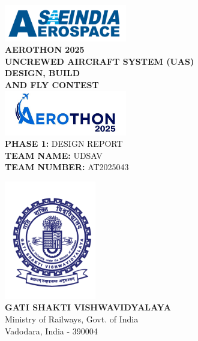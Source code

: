 \documentclass[12pt]{report}
\begin{document}
  \begin{center}
    \includegraphics[width=0.4\textwidth]{sae_aerospace.png}\\
    \vspace{1cm}
    \textbf{\LARGE AEROTHON 2025} \\
    \vspace{0.5in}
    \textbf{\Large UNCREWED AIRCRAFT SYSTEM  (UAS) \\
    DESIGN, BUILD \\ AND FLY CONTEST}\\
    \vspace{0.5cm}
    \includegraphics[width=0.4\textwidth]{aerothon2025.png}\\
    \vspace{0.5cm}
    \Large \textbf{PHASE 1:} DESIGN REPORT \\
    \vspace{0.5cm}
    \Large \textbf{TEAM NAME:} UDSAV \\
    \Large \textbf{TEAM NUMBER: } AT2025043
    
    \vspace{0.5cm}
    \includegraphics[width=0.3\textwidth]{gsvlogo.png}\\
    \vspace{0.5cm}
    \textbf{\Large GATI SHAKTI VISHWAVIDYALAYA} \\
    \large{Ministry of Railways, Govt. of India \\Vadodara, India - 390004}
  \end{center}
\end{document}
